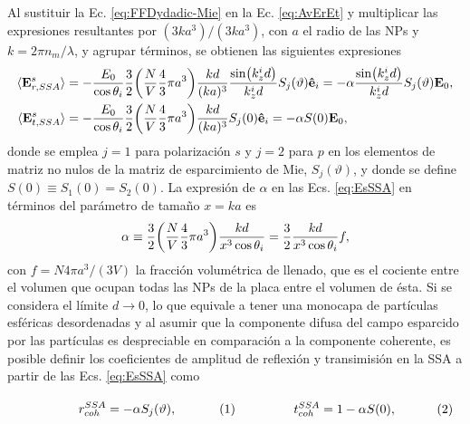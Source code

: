Al sustituir la Ec. \eqref{eq:FFDydadic-Mie} en la Ec. \eqref{eq:AvErEt} y multiplicar las expresiones resultantes por $(3ka^3)/(3ka^3)$, con $a$ el radio de las NPs y $k = 2\pi n_m /\lambda$, y agrupar términos, se obtienen las siguientes expresiones 
%
	\begin{subequations}\begin{align}
		\langle \vb{E}^s_{r,SSA}\rangle & = - \frac{E_0}{\cos\theta_i} \frac32  \qty(\frac{N}{V} \frac43\pi a^3)\frac{kd}{(ka)^3}   \frac{\sin(k_z^id)}{k_z^i d}  S_j(\vartheta)\vu{e}_i =
		-\alpha  \frac{\sin(k_z^id)}{k_z^i d}   S_j(\vartheta) \vb{E}_0,
		\label{eqs:EsSSAr}\\
	\langle \vb{E}^s_{t,SSA}\rangle &=  - \frac{E_0}{\cos\theta_i} \frac32
						 \qty(\frac{N}{V}\frac43\pi a^3  ) \frac{kd}{(ka)^3}  S_j(0) \vu{e}_i  
						 = - \alpha S(0) \vb{E}_0,
		\label{eqs:EsSSAt}
	\end{align}\label{eq:EsSSA}\end{subequations}
%
donde  se emplea $j=1$ para polarización $s$ y $j=2$ para $p$ en los elementos de matriz no nulos de la matriz de esparcimiento de Mie, $S_j(\vartheta)$, y donde se define $S(0) \equiv S_1(0)=S_2(0)$. La expresión de $\alpha$ en las Ecs. \eqref{eq:EsSSA} en términos del parámetro de tamaño $x=ka$ es
%
\begin{align*}
	\alpha \equiv \frac32 \qty(\frac{N}{V}\frac43 \pi a^3  )\frac{kd}{x^3\cos\theta_i} = \frac32\frac{kd}{ x^3\cos\theta_i} f,
	\end{align*}
%
con $f= N 4\pi a^3/(3V)$ la fracción volumétrica de llenado, que es el cociente entre el volumen que ocupan todas las NPs de la placa entre el volumen de ésta. Si se considera el límite $d\to 0$, lo que equivale a tener una monocapa de partículas esféricas desordenadas y al asumir que la componente difusa del campo esparcido por las partículas es despreciable en comparación a la componente coherente, es posible definir los coeficientes de amplitud de reflexión y transimisión en la SSA a partir de las Ecs. \eqref{eq:EsSSA} como
	
	\begin{subequations}\eqhalf{r_{coh}^{SSA} = -\alpha S_j(\vartheta),}
	\eqhalf{t_{coh}^{SSA} = 1 - \alpha S(0), }
	\label{eqs:rtcohSSA}\end{subequations}\vspace*{-1em}	
	
